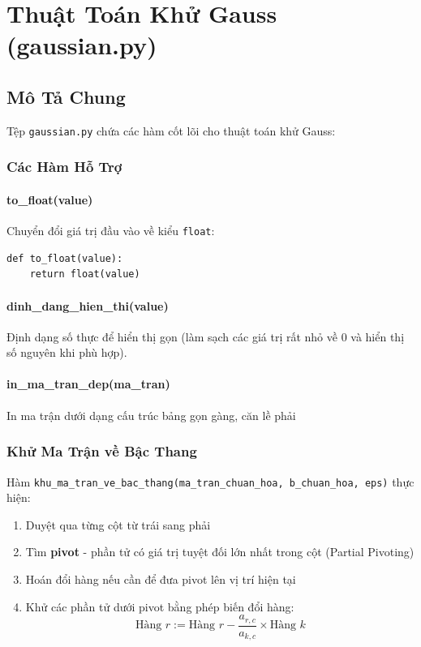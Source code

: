 \documentclass[12pt, a4paper, twoside]{article}
\begin{document}
\section{Thuật Toán Khử Gauss (gaussian.py)}

\subsection{Mô Tả Chung}

Tệp \texttt{gaussian.py} chứa các hàm cốt lõi cho thuật toán khử Gauss:

\subsubsection{Các Hàm Hỗ Trợ}

\paragraph{to\_float(value)}
Chuyển đổi giá trị đầu vào về kiểu \texttt{float}:
\begin{lstlisting}
def to_float(value):
    return float(value)
\end{lstlisting}

\paragraph{dinh\_dang\_hien\_thi(value)}
Định dạng số thực để hiển thị gọn (làm sạch các giá trị rất nhỏ về 0 và hiển thị số nguyên khi phù hợp).

\paragraph{in\_ma\_tran\_dep(ma\_tran)}
In ma trận dưới dạng cấu trúc bảng gọn gàng, căn lề phải

\subsubsection{Khử Ma Trận về Bậc Thang}

Hàm \texttt{khu\_ma\_tran\_ve\_bac\_thang(ma\_tran\_chuan\_hoa, b\_chuan\_hoa, eps)} thực hiện:

\begin{enumerate}
    \item Duyệt qua từng cột từ trái sang phải
    \item Tìm \textbf{pivot} - phần tử có giá trị tuyệt đối lớn nhất trong cột (Partial Pivoting)
    \item Hoán đổi hàng nếu cần để đưa pivot lên vị trí hiện tại
    \item Khử các phần tử dưới pivot bằng phép biến đổi hàng:
    \[
    \text{Hàng } r := \text{Hàng } r - \frac{a_{r,c}}{a_{k,c}} \times \text{Hàng } k
    \]
\end{enumerate}
\end{document}
